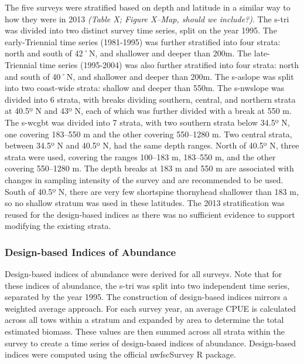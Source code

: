\documentclass[11pt,
  english,
  letterpaper,
]{article}
\begin{document}
The five surveys were stratified based on depth and latitude in a similar way to how they were in 2013 \emph{\emph{(Table X; Figure X--Map, should we include?)}}. The \gls{s-tri} was divided into two distinct survey time series, split on the year 1995. The early-Triennial time series (1981-1995) was further stratified into four strata: north and south of 42˚N, and shallower and deeper than 200m. The late-Triennial time series (1995-2004) was also further stratified into four strata: north and south of 40˚N, and shallower and deeper than 200m. The \gls{s-aslope} was split into two coast-wide strata: shallow and deeper than 550m. The \gls{s-nwslope} was divided into 6 strata, with breaks dividing southern, central, and northern strata at 40.5º N and 43º N, each of which was further divided with a break at 550 m. The \gls{s-wcgbt} was divided into 7 strata, with two southern strata below 34.5º N, one covering 183--550 m and the other covering 550--1280 m. Two central strata, between 34.5º N and 40.5º N, had the same depth ranges. North of 40.5º N, three strata were used, covering the ranges 100--183 m, 183--550 m, and the other covering 550--1280 m. The depth breaks at 183 m and 550 m are associated with changes in sampling intensity of the survey and are recommended to be used. South of 40.5º N, there are very few shortspine thornyhead shallower than 183 m, so no shallow stratum was used in these latitudes. The 2013 stratification was reused for the design-based indices as there was no sufficient evidence to support modifying the existing strata.

\hypertarget{design-based-indices-of-abundance}{%
\subsubsection{Design-based Indices of Abundance}\label{design-based-indices-of-abundance}}

Design-based indices of abundance were derived for all surveys. Note that for these indices of abundance, the \gls{s-tri} was split into two independent time series, separated by the year 1995. The construction of design-based indices mirrors a weighted average approach. For each survey year, an average CPUE is calculated across all tows within a stratum and expanded by area to determine the total estimated biomass. These values are then summed across all strata within the survey to create a time series of design-based indices of abundance. Design-based indices were computed using the official nwfscSurvey R package.
\end{document}
